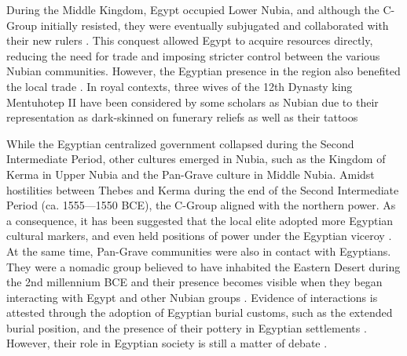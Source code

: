 During the Middle Kingdom, Egypt occupied Lower Nubia, and although the C-Group initially resisted, they were eventually subjugated and collaborated with their new rulers \parencites[p.~172]{hafsaasCGroupPeopleLower2020}. This conquest allowed Egypt to acquire resources directly, reducing the need for trade and imposing stricter control between the various Nubian communities. However, the Egyptian presence in the region also benefited the local trade \parencite[p.~138]{näserStructuresRealitiesEgyptianNubian2013}. In royal contexts, three wives of the 12th Dynasty king Mentuhotep II have been considered by some scholars as Nubian due to their representation as dark-skinned on funerary reliefs as well as their tattoos \parencites[p.~67]{ashbyDancingHathorNubian2018}[p.~572-573]{raueNubiansEgypt3rd2019}[p.~71-73]{renautTattooedWomenNubia2020}


While the Egyptian centralized government collapsed during the Second Intermediate Period, other cultures emerged in Nubia, such as the Kingdom of Kerma in Upper Nubia and the Pan-Grave culture in Middle Nubia. Amidst hostilities between Thebes and Kerma during the end of the Second Intermediate Period (ca. 1555---1550 BCE), the C-Group aligned with the northern power. As a consequence, it has been suggested that the local elite adopted more Egyptian cultural markers, and even held positions of power under the Egyptian viceroy \parencites{hafsaas-tsakosKushEgyptCGroup2010}{hafsaasCGroupPeopleLower2020}. At the same time, Pan-Grave communities were also in contact with Egyptians. They were a nomadic group believed to have inhabited the Eastern Desert during the 2nd millennium BCE and their presence becomes visible when they began interacting with Egypt and other Nubian groups \parencites[p.~81, 89]{näserNomadsNileArchaeology2012}[p.~175]{desouzaNotMarginalMarginalised2022}. Evidence of interactions is attested through the adoption of Egyptian burial customs, such as the extended burial position, and the presence of their pottery in Egyptian settlements  \parencites[p.~294-296]{meurerNubiansEgyptEarly2020}[p.~4]{desouzaMeltingPotsEntanglement2020}[p.~125-126]{desouzaBlurringBoundariesMore2024}. However, their role in Egyptian society is still a matter of debate
\parencite[p.~229]{liszkaPanGraveMedjayIntersection2020}.


